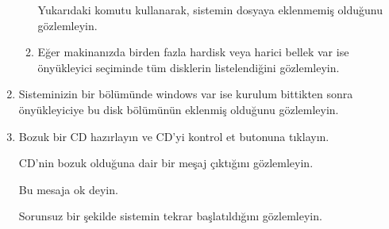 \documentclass[a4paper,10pt]{article}
\begin{document}
\begin{enumerate}
\begin{enumerate}
	Yukarıdaki komutu kullanarak, sistemin dosyaya eklenmemiş olduğunu gözlemleyin.

    \item Eğer makinanızda birden fazla hardisk veya harici bellek var ise önyükleyici seçiminde tüm disklerin listelendiğini gözlemleyin.
      \end{enumerate}
 \item Sisteminizin bir bölümünde windows var ise kurulum bittikten sonra önyükleyiciye bu disk bölümünün eklenmiş olduğunu gözlemleyin.
\item Bozuk bir CD hazırlayın ve CD'yi kontrol et butonuna tıklayın.

CD'nin bozuk olduğuna dair bir meşaj çıktığını gözlemleyin.

Bu mesaja ok deyin.

Sorunsuz bir şekilde sistemin tekrar başlatıldığını gözlemleyin.

\end{enumerate}
\end{document}
